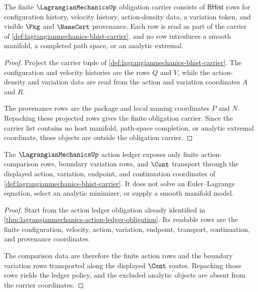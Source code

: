 \begin{theorem}
\label{thm:lagrangianmechanics-finite-obligation-carrier}
The finite $\LagrangianMechanicsUp$ obligation carrier consists of
$\mathsf{BHist}$ rows for configuration history, velocity history,
action-density data, a variation token, and visible $\Pkg$ and $\NameCert$
provenance. Each row is read as part of the carrier of
\autoref{def:lagrangianmechanics-bhist-carrier}, and no row introduces a
smooth manifold, a completed path space, or an analytic extremal.
\end{theorem}
\begin{proof}
Project the carrier tuple of
\autoref{def:lagrangianmechanics-bhist-carrier}. The configuration and
velocity histories are the rows $Q$ and $V$, while the action-density and
variation data are read from the action and variation coordinates $A$ and
$R$.

The provenance rows are the package and local naming coordinates $P$ and $N$.
Repacking these projected rows gives the finite obligation carrier. Since the
carrier list contains no host manifold, path-space completion, or analytic
extremal coordinate, those objects are outside the obligation carrier.
\end{proof}

\begin{theorem}
\label{thm:lagrangianmechanics-action-ledger-policy}
The $\LagrangianMechanicsUp$ action ledger exposes only finite
action-comparison rows, boundary variation rows, and $\Cont$ transport through
the displayed action, variation, endpoint, and continuation coordinates of
\autoref{def:lagrangianmechanics-bhist-carrier}. It does not solve an
Euler--Lagrange equation, select an analytic minimizer, or supply a smooth
manifold model.
\end{theorem}
\begin{proof}
Start from the action ledger obligation already identified in
\autoref{thm:lagrangianmechanics-action-ledger-obligation}. Its readable rows
are the finite configuration, velocity, action, variation, endpoint,
transport, continuation, and provenance coordinates.

The comparison data are therefore the finite action rows and the boundary
variation rows transported along the displayed $\Cont$ routes. Repacking those
rows yields the ledger policy, and the excluded analytic objects are absent
from the carrier coordinates.
\end{proof}

